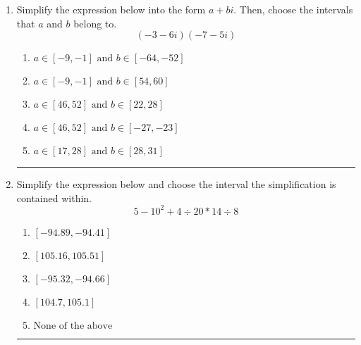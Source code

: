 \documentclass[14pt]{extbook}
\newcommand{\litem}[1]{\item#1\hspace*{-1cm}\rule{\textwidth}{0.4pt}}
\begin{document}
\begin{enumerate}
{\begin{enumerate}[label=\Alph*.]
\end{enumerate} }
\litem{
Simplify the expression below into the form $a+bi$. Then, choose the intervals that $a$ and $b$ belong to.\[ (-3 - 6 i)(-7 - 5 i) \]\begin{enumerate}[label=\Alph*.]
\item \( a \in [-9, -1] \text{ and } b \in [-64, -52] \)
\item \( a \in [-9, -1] \text{ and } b \in [54, 60] \)
\item \( a \in [46, 52] \text{ and } b \in [22, 28] \)
\item \( a \in [46, 52] \text{ and } b \in [-27, -23] \)
\item \( a \in [17, 28] \text{ and } b \in [28, 31] \)

\end{enumerate} }
\litem{
Simplify the expression below and choose the interval the simplification is contained within.\[ 5 - 10^2 + 4 \div 20 * 14 \div 8 \]\begin{enumerate}[label=\Alph*.]
\item \( [-94.89, -94.41] \)
\item \( [105.16, 105.51] \)
\item \( [-95.32, -94.66] \)
\item \( [104.7, 105.1] \)
\item \( \text{None of the above} \)

\end{enumerate} }
\end{enumerate}
\end{document}
